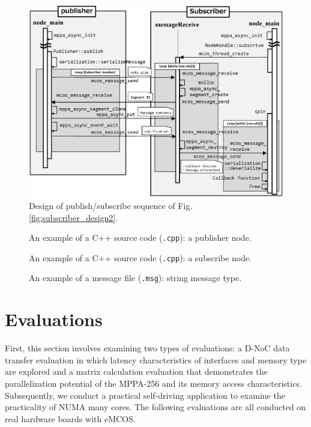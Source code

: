 \begin{figure}[!htbp]
  \centering
  \includegraphics[width=0.7\linewidth]{../figure/roslite/design/pubsub_thread_design2.eps}
  \caption{\label{fig:pubsub_thread_design2}
    Design of publish/subscribe sequence of Fig. \ref{fig:subscriber_design2}.}
\end{figure}

\begin{figure}[!htbp]
  \centering
  
  \caption{\label{code:talker}
    An example of a C++ source code (\texttt{.cpp}): a publisher node.}
\end{figure}

\begin{figure}[!htbp]
  \centering
  
  \caption{\label{code:listener}
    An example of a C++ source code (\texttt{.cpp}): a subscribe node.}
\end{figure}

\begin{figure}[!htbp]
  \centering
  
  \caption{\label{code:msg}
    An example of a message file (\texttt{.msg}): string message type.}
\end{figure}

\chapter{Evaluations}
\label{chap:evaluations}
First, this section involves examining two types of evaluations: a D-NoC data transfer evaluation in which latency characteristics of interfaces and memory type are explored and a matrix calculation evaluation that demonstrates the parallelization potential of the MPPA-256 and its memory access characteristics.
Subsequently, we conduct a practical self-driving application to examine the practicality of NUMA many cores.
The following evaluations are all conducted on real hardware boards with eMCOS.

